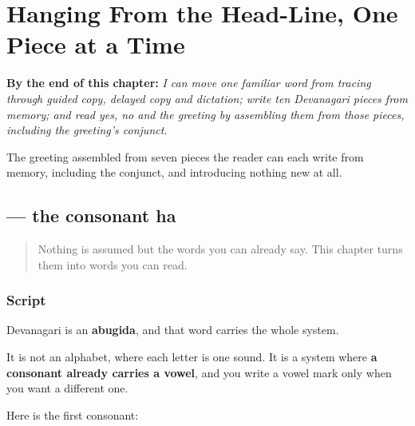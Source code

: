 
\chapter{Hanging From the Head-Line, One Piece at a Time}
\label{ch:mr-script-first}

\begin{chapteropening}
\textbf{By the end of this chapter:} \emph{I can move one familiar word from tracing through guided copy, delayed copy and dictation; write ten Devanagari pieces from memory; and read yes, no and the greeting by assembling them from those pieces, including the greeting's conjunct.}

The greeting assembled from seven pieces the reader can each write from memory, including the conjunct, and introducing nothing new at all.
\end{chapteropening}

\section[ha]{ — the consonant ha}

\label{lesson:MR-W01-ha}



\begin{quote}
Nothing is assumed but the words you can already say. This chapter turns them into words you can read.
\end{quote}

\subsection*{Script}
Devanagari is an \textbf{abugida}, and that word carries the whole system.

It is not an alphabet, where each letter is one sound. It is a system where \textbf{a consonant already carries a vowel}, and you write a vowel mark only when you want a different one.

Here is the first consonant:

\begin{quote}
\end{quote}

